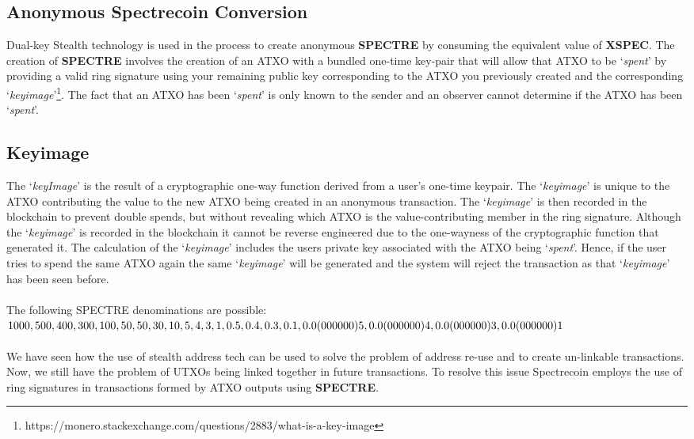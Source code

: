 \subsection{Anonymous Spectrecoin Conversion}
Dual-key Stealth technology is used in the process to create anonymous 
\textbf{SPECTRE} by consuming the equivalent value of \textbf{XSPEC}. The 
creation of \textbf{SPECTRE} involves the creation of an ATXO with a 
bundled one-time key-pair that will allow that ATXO to be ‘\textit{spent}’ 
by providing a valid ring signature using your remaining public key 
corresponding to the ATXO you previously created and the corresponding 
‘\textit{keyimage}’\footnote{https://monero.stackexchange.com/questions/2883/what-is-a-key-image}. 
The fact that an ATXO has been ‘\textit{spent}’ is only known to the sender 
and an observer cannot determine if the ATXO has been ‘\textit{spent}’.



\subsection{Keyimage}
The ‘\textit{keyImage}’ is the result of a cryptographic one-way function derived
from a user’s one-time keypair. The ‘\textit{keyimage}’ is unique to the ATXO
contributing the value to the new ATXO being created in an anonymous
transaction. The ‘\textit{keyimage}’ is then recorded in the blockchain to prevent
double spends, but without revealing which ATXO is the value-contributing
member in the ring signature. Although the ‘\textit{keyimage}’ is recorded in the
blockchain it cannot be reverse engineered due to the one-wayness of the
cryptographic function that generated it. The calculation of the ‘\textit{keyimage}’
includes the users private key associated with the ATXO being ‘\textit{spent}’.
Hence, if the user tries to spend the same ATXO again the same ‘\textit{keyimage}’
will be generated and the system will reject the transaction as that
‘\textit{keyimage}’ has been seen before.
\\
\\
The following SPECTRE denominations are possible:
\\
$1000, 500, 400, 300, 100, 50, 50, 30, 10, 5, 4, 3, 1, \\0.5, 0.4, 0.3, 0.1, 0.0(000000)5, 0.0(000000)4, 0.0(000000)3, 0.0(000000)1$
\\
\\
\noindent
We have seen how the use of stealth address tech can be used to solve the
problem of address re-use and to create un-linkable transactions. Now, we
still have the problem of UTXOs being linked together in future transactions.
To resolve this issue Spectrecoin employs the use of ring signatures in
transactions formed by ATXO outputs using \textbf{SPECTRE}.
